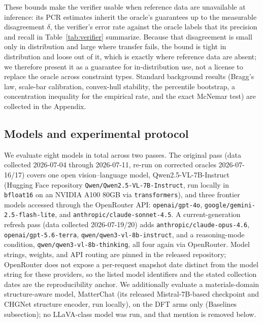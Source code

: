 \documentclass[pdflatex,sn-nature]{sn-jnl}
\begin{document}
\noindent These bounds make the verifier usable when reference data are unavailable at
inference: its PCR estimates inherit the oracle's guarantees up to the measurable
disagreement $\delta$, the verifier's error rate against the oracle labels that its
precision and recall in Table~\ref{tab:verifier} summarize. Because that disagreement is
small only in distribution and large where transfer fails, the bound is tight in
distribution and loose out of it, which is exactly where reference data are absent; we
therefore present it as a guarantee for in-distribution use, not a license to replace the
oracle across constraint types. Standard background results
(Bragg's law, scale-bar calibration, convex-hull stability, the percentile bootstrap, a
concentration inequality for the empirical rate, and the exact McNemar test) are
collected in the Appendix.

\subsection*{Models and experimental protocol}
We evaluate eight models in total across two passes. The original pass (data collected
2026-07-04 through 2026-07-11, re-run on corrected oracles 2026-07-16/17) covers one open
vision--language model, Qwen2.5-VL-7B-Instruct\cite{qwen25vl} (Hugging Face repository
\texttt{Qwen/Qwen2.5-VL-7B-Instruct}, run locally in \texttt{bfloat16} on an NVIDIA A100
80GB via \texttt{transformers}), and three frontier models accessed through the OpenRouter
API: \texttt{openai/gpt-4o}, \texttt{google/gemini-2.5-flash-lite}, and
\texttt{anthropic/claude-sonnet-4.5}. A current-generation refresh pass (data collected
2026-07-19/20) adds \texttt{anthropic/claude-opus-4.6}, \texttt{openai/gpt-5.6-terra},
\texttt{qwen/qwen3-vl-8b-instruct}, and a reasoning-mode condition,
\texttt{qwen/qwen3-vl-8b-thinking}, all four again via OpenRouter. Model strings, weights, and
API routing are pinned in the released repository; OpenRouter does not expose a
per-request snapshot date distinct from the model string for these providers, so the
listed model identifiers and the stated collection dates are the reproducibility anchor. We additionally evaluate a materials-domain
structure-aware model, MatterChat\cite{matterchat2026} (its released Mistral-7B-based
checkpoint and CHGNet structure encoder, run locally), on the DFT arms only (Baselines
subsection); no LLaVA-class model was run, and that mention is removed below.
\end{document}
